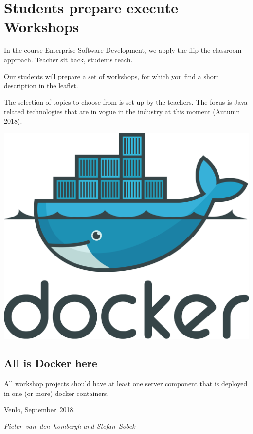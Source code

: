 \section*{Students prepare execute Workshops}
In the course Enterprise Software Development, we apply the
flip-the-classroom approach. Teacher sit back, students teach. 

Our students will prepare a set of workshops, for which you find a short
description in the leaflet.

The selection of topics to choose from is set up by the teachers. The
focus is Java related technologies that are in vogue in the industry
at this moment (Autumn 2018).

\hfill\includegraphics[width=.4\linewidth]{images/docker.pdf}

\subsection*{All is Docker here}
All workshop projects should have at least one server component that is deployed in one (or more) docker containers. 

Venlo, September~2018.

\hfill\textit{Pieter~van~den~hombergh and Stefan~Sobek} 
